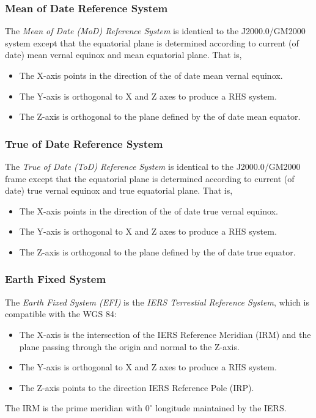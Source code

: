\documentclass [12pt, a4paper] {article}
\begin{document}
\subsubsection{Mean of Date Reference System}
The \emph{Mean of Date (MoD) Reference System} is identical to the J2000.0/GM2000 system except
that the equatorial plane is determined according to current (of date) mean vernal equinox
and mean equatorial plane. That is, 
\begin {itemize}
  \item The X-axis points in the direction of the of date mean vernal equinox.
  \item The Y-axis is orthogonal to X and Z axes to produce a RHS system.
  \item The Z-axis is orthogonal to the plane defined by the of date mean equator.
\end {itemize}

\subsubsection{True of Date Reference System}
The \emph{True of Date (ToD) Reference System} is identical to the J2000.0/GM2000 frame except
that the equatorial plane is determined according to current (of date) true vernal equinox
and true equatorial plane. That is, 
\begin {itemize}
  \item The X-axis points in the direction of the of date true vernal equinox.
  \item The Y-axis is orthogonal to X and Z axes to produce a RHS system.
  \item The Z-axis is orthogonal to the plane defined by the of date true equator.
\end {itemize}

\subsubsection{Earth Fixed System}
The \emph{Earth Fixed System (EFI)} is the \emph{IERS Terrestial Reference System}, which is 
compatible with the WGS 84:
\begin {itemize}
  \item The X-axis is the intersection of the IERS Reference Meridian (IRM) 
  and the plane passing through the origin and normal to the Z-axis. 
  \item The Y-axis is orthogonal to X and Z axes to produce a RHS system.
  \item The Z-axis points to the direction IERS Reference Pole (IRP).
\end {itemize}
The IRM is the prime meridian with $0^\circ$ longitude maintained by the IERS. 
\end{document}
